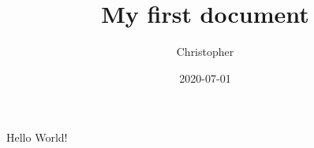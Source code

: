 \documentclass{article}
\title{My first document}
\date{2020-07-01}
\author{Christopher}
\begin{document}
	\maketitle
	\newpage
	
	Hello World!
\end{document}
